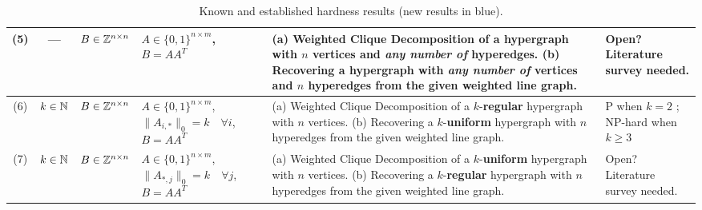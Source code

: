 \begin{table*}[ht]
\begin{tabular}{|c|c|p{}|p{}|p{}|p{}|}
    \hline
    (5) & --- & $B \in \mathbb{Z}^{n \times n}$
    & $A \in \{0,1\}^{n \times m}$,\newline $B=AA^T$
    & (a) Weighted Clique Decomposition of a hypergraph with $n$ vertices and \textit{any number of} hyperedges.
    (b) Recovering a hypergraph with \textit{any number of} vertices and $n$ hyperedges from the given weighted line graph.
    & Open? Literature survey needed.\\
    \hline
    (6) & $k \in \mathbb{N}$ & $B \in \mathbb{Z}^{n \times n}$
    & $A \in \{0,1\}^{n \times m}$,\newline 
    $\|A_{i,*}\|_0=k\quad\forall i$,\newline
    $B=AA^T$
    & (a) Weighted Clique Decomposition of a $k$-\textbf{regular} hypergraph with $n$ vertices.
    (b) Recovering a $k$-\textbf{uniform} hypergraph with $n$ hyperedges from the given weighted line graph.
    & P when $k=2$ \cite{roussopoulos_max_1973,lehot_optimal_1974,syslo_labeling_1982,degiorgi_dynamic_1995,liu_iligra_2015};\newline
    NP-hard when $k \geq 3$ \cite{poljak_complexity_1981,chen_symmetric_2022}\\
    \hline
    (7) & $k \in \mathbb{N}$ & $B \in \mathbb{Z}^{n \times n}$
    & $A \in \{0,1\}^{n \times m}$,\newline 
    $\|A_{*,j}\|_0=k\quad \forall j$,\newline
    $B=AA^T$
    & (a) Weighted Clique Decomposition of a $k$-\textbf{uniform} hypergraph with $n$ vertices.
    (b) Recovering a $k$-\textbf{regular} hypergraph with $n$ hyperedges from the given weighted line graph.
    & Open? Literature survey needed.\\
    \hline
  \end{tabular}

  \caption{%
  Known and established hardness results (new results in blue).
  }
  \label{tab:hardness}
\end{table*}
